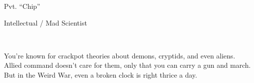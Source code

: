 \documentclass{article}
\newcommand{\Bra}{2}
\newcommand{\Agi}{3}
\newcommand{\Int}{3}
\newcommand{\Cun}{2}
\newcommand{\Wil}{3}
\newcommand{\Pre}{2}
\begin{document}
\begin{minipage}{0.6\linewidth}
{\Huge Pvt. ``Chip'' }

{\large Intellectual / Mad Scientist}

\vspace{1.5em}

\end{minipage}\hfill%
\\

\vspace{0em}\raggedright


You're known for crackpot theories about demons, cryptids, and even aliens.  Allied command doesn't care for them, only that you can carry a gun and march.  But in the Weird War, even a broken clock is right thrice a day.


\begin{center}
\Characteristics{\Bra}{\Agi}{\Int}{\Cun}{\Wil}{\Pre}

\noindent\null\hfill{}\quad
{}\null\quad
{}\quad
{}\hfill\null
{}\quad
\end{center}


\vspace{0.5em}



\vspace{-3em}
\end{document}
